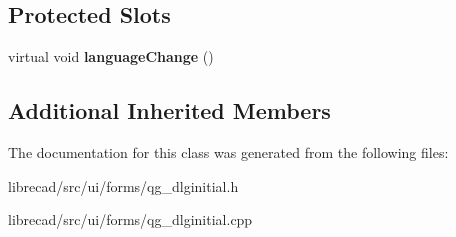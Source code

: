 \subsection*{Protected Slots}
\begin{DoxyCompactItemize}
\item 
\hypertarget{classQG__DlgInitial_aa1923ca7192fbc7a3d1fad8af75c703e}{virtual void {\bfseries language\-Change} ()}\label{classQG__DlgInitial_aa1923ca7192fbc7a3d1fad8af75c703e}

\end{DoxyCompactItemize}
\subsection*{Additional Inherited Members}


The documentation for this class was generated from the following files\-:\begin{DoxyCompactItemize}
\item 
librecad/src/ui/forms/qg\-\_\-dlginitial.\-h\item 
librecad/src/ui/forms/qg\-\_\-dlginitial.\-cpp\end{DoxyCompactItemize}
